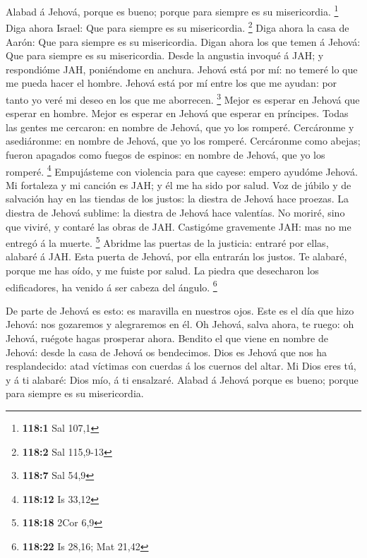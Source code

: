  Alabad á Jehová, porque es bueno; porque para siempre es su
misericordia. \footnote{\textbf{118:1} Sal 107,1}  Diga
ahora Israel: Que para siempre es su misericordia. \footnote{\textbf{118:2}
  Sal 115,9-13}  Diga ahora la casa de Aarón: Que para
siempre es su misericordia.  Digan ahora los que temen á
Jehová: Que para siempre es su misericordia.  Desde la
angustia invoqué á JAH; y respondióme JAH, poniéndome en anchura.
 Jehová está por mí: no temeré lo que me pueda hacer el
hombre.  Jehová está por mí entre los que me ayudan: por
tanto yo veré mi deseo en los que me aborrecen. \footnote{\textbf{118:7}
  Sal 54,9}  Mejor es esperar en Jehová que esperar en
hombre.  Mejor es esperar en Jehová que esperar en
príncipes.  Todas las gentes me cercaron: en nombre de
Jehová, que yo los romperé.  Cercáronme y asediáronme: en
nombre de Jehová, que yo los romperé.  Cercáronme como
abejas; fueron apagados como fuegos de espinos: en nombre de Jehová, que
yo los romperé. \footnote{\textbf{118:12} Is 33,12} 
Empujásteme con violencia para que cayese: empero ayudóme Jehová.
 Mi fortaleza y mi canción es JAH; y él me ha sido por
salud.  Voz de júbilo y de salvación hay en las tiendas de
los justos: la diestra de Jehová hace proezas.  La diestra
de Jehová sublime: la diestra de Jehová hace valentías.  No
moriré, sino que viviré, y contaré las obras de JAH. 
Castigóme gravemente JAH: mas no me entregó á la muerte. \footnote{\textbf{118:18}
  2Cor 6,9}  Abridme las puertas de la justicia: entraré
por ellas, alabaré á JAH.  Esta puerta de Jehová, por ella
entrarán los justos.  Te alabaré, porque me has oído, y me
fuiste por salud.  La piedra que desecharon los
edificadores, ha venido á ser cabeza del ángulo. \footnote{\textbf{118:22}
  Is 28,16; Mat 21,42}

 De parte de Jehová es esto: es maravilla en nuestros ojos.
 Este es el día que hizo Jehová: nos gozaremos y
alegraremos en él.  Oh Jehová, salva ahora, te ruego: oh
Jehová, ruégote hagas prosperar ahora.  Bendito el que
viene en nombre de Jehová: desde la casa de Jehová os bendecimos.
 Dios es Jehová que nos ha resplandecido: atad víctimas con
cuerdas á los cuernos del altar.  Mi Dios eres tú, y á ti
alabaré: Dios mío, á ti ensalzaré.  Alabad á Jehová porque
es bueno; porque para siempre es su misericordia.

